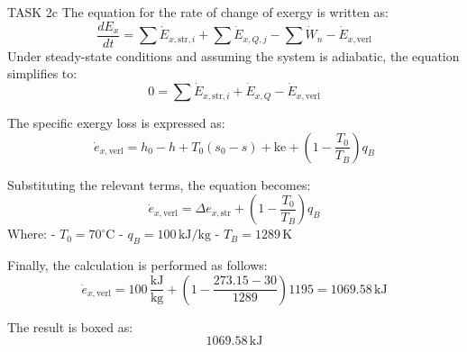TASK 2c  
The equation for the rate of change of exergy is written as:  
\[
\frac{dE_x}{dt} = \sum \dot{E}_{x,\text{str},i} + \sum \dot{E}_{x,Q,j} - \sum \dot{W}_n - \dot{E}_{x,\text{verl}}
\]  
Under steady-state conditions and assuming the system is adiabatic, the equation simplifies to:  
\[
0 = \sum \dot{E}_{x,\text{str},i} + \dot{E}_{x,Q} - \dot{E}_{x,\text{verl}}
\]  

The specific exergy loss is expressed as:  
\[
\dot{e}_{x,\text{verl}} = h_0 - h + T_0(s_0 - s) + \text{ke} + \left( 1 - \frac{T_0}{T_B} \right) q_B
\]  

Substituting the relevant terms, the equation becomes:  
\[
\dot{e}_{x,\text{verl}} = \Delta e_{x,\text{str}} + \left( 1 - \frac{T_0}{T_B} \right) q_B
\]  
Where:  
- \( T_0 = 70^\circ\text{C} \)  
- \( q_B = 100 \, \text{kJ/kg} \)  
- \( T_B = 1289 \, \text{K} \)  

Finally, the calculation is performed as follows:  
\[
\dot{e}_{x,\text{verl}} = 100 \, \frac{\text{kJ}}{\text{kg}} + \left( 1 - \frac{273.15 - 30}{1289} \right) 1195 = 1069.58 \, \text{kJ}
\]  

The result is boxed as:  
\[
\boxed{1069.58 \, \text{kJ}}
\]